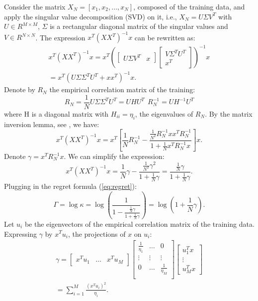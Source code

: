 \documentclass[conference,letterpaper]{IEEEtran}
\begin{document}
Consider the matrix $X_N = [x_1,x_2, \hdots, x_{N}]$, composed of the training data, and apply the singular value decomposition (SVD) on it, i.e., $X_N = U \Sigma V^T$ with $U\in R^{M \times M}$, 
$\Sigma$ is a rectangular diagonal matrix of the singular values and $V \in R^{N \times N}$. 
The expression $x^T(XX^T)^{-1}x$ can be rewritten as:
\begin{multline}
x^T(XX^T)^{-1}x = 
x^T\left(\begin{bmatrix} U \Sigma V^T & x \end{bmatrix}
\begin{bmatrix}
V \Sigma^T U^T \\ x^T
\end{bmatrix}
\right)^{-1}x \\
=  x^T\left(U \Sigma \Sigma^T U^T + x x^T\right)^{-1}x.
\end{multline}
Denote by $R_N$ the empirical correlation matrix of the training: 
\begin{equation}
R_N=\frac{1}{N} U \Sigma \Sigma^T U^T=U H U^T \ \ R_N^{-1}=  U H^{-1} U^T   
\end{equation}
where H is a diagonal matrix with $H_{ii}=\eta_i$, the eigenvalues of $R_N$.
By the matrix inversion lemma, see \cite{press2007section}, 
we have:
\begin{equation}
x^T(XX^T)^{-1}x = 
x^T \left[ \frac{1}{N}R_N^{-1} -  \frac{\frac{1}{N^2}R_N^{-1} x x^T  R_N^{-1}}{1 + \frac{1}{N} x^T  R_N^{-1} x} \right] x.
\end{equation}
Denote $\gamma = x^T R_N^{-1} x$. We can simplify the expression:
\begin{equation}
x^T(XX^T)^{-1}x = \frac{1}{N}\gamma - \frac{\frac{1}{N^2}\gamma^2}{1+\frac{1}{N}\gamma} = \frac{\frac{1}{N}\gamma}{1+\frac{1}{N}\gamma}.
\end{equation}
Plugging in the regret formula (\ref{eq:regret}):
\begin{equation}
\Gamma = \log \kappa = \log \left( \frac{1}{1-\frac{\frac{1}{N}\gamma}{1+\frac{1}{N}\gamma}} \right)
=  \log \left( 1+\frac{1}{N} \gamma \right).
\end{equation}
Let $u_i$ be the eigenvectors of the empirical correlation matrix of the training data. 
Expressing $\gamma$ by $x^Tu_i$, the projections of $x$ on $u_i$:
\begin{multline}
\gamma = 
\begin{bmatrix}
x^T u_1 & \hdots & x^T u_M
\end{bmatrix}
\begin{bmatrix}
\frac{1}{\eta_1} & \hdots & 0 \\
\vdots & \vdots &  \vdots \\
0 & \hdots &  \frac{1}{\eta_M} \\
\end{bmatrix}
\begin{bmatrix}
u_1^T x \\ \vdots \\ u_M^T x
\end{bmatrix} \\
= \sum_{i=1}^{M} \frac{\left(x^Tu_i\right)^2}{\eta_i}.
\end{multline}
\end{document}
